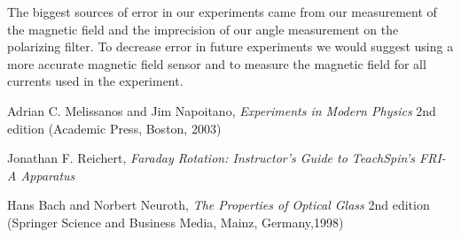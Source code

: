 \documentclass[prb,preprint]{revtex4-1}
\begin{document}
The biggest sources of error in our experiments came from our measurement of the magnetic field and the imprecision of our angle measurement on the polarizing filter. To decrease error in future experiments we would suggest using a more accurate magnetic field sensor and to measure the magnetic field for all currents used in the experiment. 


\begin{thebibliography}{3}

 Adrian C. Melissanos and Jim Napoitano, \textit{Experiments in Modern Physics} 2nd edition (Academic Press, Boston, 2003)

 Jonathan F. Reichert, \textit{Faraday Rotation: Instructor's Guide to TeachSpin's FRI-A Apparatus}

 Hans Bach and Norbert Neuroth, \textit{The Properties of Optical Glass} 2nd edition (Springer Science and Business Media, Mainz, Germany,1998)

\end{thebibliography}
\end{document}
